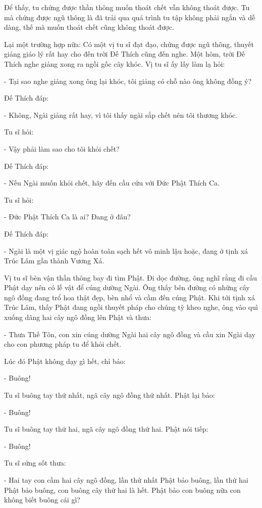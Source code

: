 \documentclass[
  12pt,
  oneside]{book}
\begin{document}
Để thấy, tu chứng được thần thông muốn thoát chết vẫn không thoát được. Tu mà chứng được ngũ thông là đã trải qua quá trình tu tập không phải ngắn và dễ dàng, thế mà muốn thoát chết cũng không thoát được.

Lại một trường hợp nữa: Có một vị tu sĩ đạt đạo, chứng được ngũ thông, thuyết giảng giáo lý rất hay cho đến trời Đế Thích cũng đến nghe. Một hôm, trời Đế Thích nghe giảng xong ra ngồi gốc cây khóc. Vị tu sĩ ấy lấy làm lạ hỏi:

- Tại sao nghe giảng xong ông lại khóc, tôi giảng có chỗ nào ông không đồng ý?

Đế Thích đáp:

- Không, Ngài giảng rất hay, vì tôi thấy ngài sắp chết nên tôi thương khóc.

Tu sĩ hỏi:

- Vậy phải làm sao cho tôi khỏi chết?

Đế Thích đáp:

- Nếu Ngài muốn khỏi chết, hãy đến cầu cứu với Đức Phật Thích Ca.

Tu sĩ hỏi:

- Đức Phật Thích Ca là ai? Đang ở đâu?

Đế Thích đáp:

- Ngài là một vị giác ngộ hoàn toàn sạch hết vô minh lậu hoặc, đang ở tịnh xá Trúc Lâm gần thành Vương Xá.

Vị tu sĩ bèn vận thần thông bay đi tìm Phật. Đi dọc đường, ông nghĩ rằng đi cầu Phật dạy nên có lễ vật để cúng dường Ngài. Ông thấy bên đường có những cây ngô đồng đang trổ hoa thật đẹp, bèn nhổ và cầm đến cúng Phật. Khi tới tịnh xá Trúc Lâm, thấy Phật đang ngồi thuyết pháp cho chúng tỳ kheo nghe, ông vào quì xuống dâng hai cây ngô đồng lên Phật và thưa:

- Thưa Thế Tôn, con xin cúng dường Ngài hai cây ngô đồng và cầu xin Ngài dạy cho con phương pháp tu để khỏi chết.

Lúc đó Phật không dạy gì hết, chỉ bảo:

- Buông!

Tu sĩ buông tay thứ nhất, ngã cây ngô đồng thứ nhất. Phật lại bảo:

- Buông!

Tu sĩ buông tay thứ hai, ngã cây ngô đồng thứ hai. Phật nói tiếp:

- Buông!

Tu sĩ sửng sốt thưa:

- Hai tay con cầm hai cây ngô đồng, lần thứ nhất Phật bảo buông, lần thứ hai Phật bảo buông, con buông cây thứ hai là hết. Phật bảo con buông nữa con không biết buông cái gì?
\end{document}
